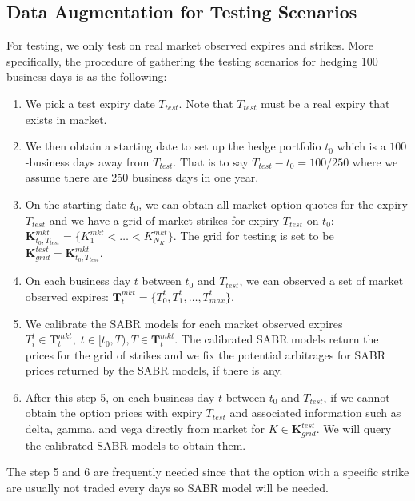 \documentclass[letterpaper,12pt,titlepage,oneside,final]{book}
\numberwithin{equation}{section}
\theoremstyle{definition}
\begin{document}
\subsection{Data Augmentation for Testing Scenarios}
For testing, we only test on real market observed expires and strikes. More specifically, the procedure of gathering the testing scenarios for hedging 100 business days is as the following:

\begin{enumerate}
	\item We pick a  test expiry date $T_{test}$. Note that  $T_{test}$ must be a real expiry that exists in market. 
	\item We then obtain  a starting date to set up the hedge portfolio $t_0$ which is  a $100$-business days away from $T_{test}$. That is to say $T_{test}-t_0=100/250$ where we assume there are 250 business days in one year. 
	\item On the starting date $t_0$, we can obtain all market option quotes for the expiry  $T_{test}$ and we have a grid of market strikes for expiry $T_{test}$ on $t_0$:
	$\mathbf{K}^{mkt}_{t_0,T_{test}}=\{K^{mkt}_1<\dots<K^{mkt}_{N_K}\}$. The grid for testing is set to be $\mathbf{K}^{test}_{grid}=\mathbf{K}^{mkt}_{t_0,T_{test}}$.
	\item On each business day $t$ between  $t_0$ and  $T_{test}$, we can observed a set of market observed expires: $\mathbf{T}_t^{mkt}=\{T_0^{t},T_1^{t},\dots,T_{max}^{t}\}$.
	\item  We calibrate the SABR models for each market observed expires $T_i^{t} \in \mathbf{T}_t^{mkt},	\;  t \in [t_0, T),T \in \mathbf{T}_t^{mkt}$. The calibrated SABR models return the prices  for the grid of strikes and we fix the potential arbitrages for SABR prices returned by the SABR models, if there is any. 
	\item After this step 5, on each business day $t$ between  $t_0$ and  $T_{test}$, if we cannot obtain the option prices with expiry $T_{test}$ and associated information such as delta, gamma, and vega directly from market for $K \in \mathbf{K}^{test}_{grid}$. We will query the calibrated SABR models to obtain them.
\end{enumerate}
The step 5 and 6 are frequently needed since that the option with a specific strike are usually not traded every days so SABR model will be needed. 
\end{document}
